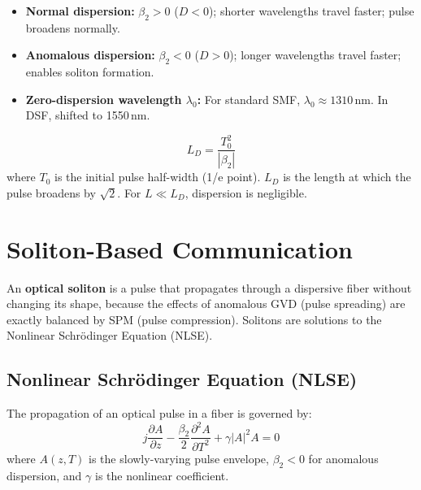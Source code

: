 \documentclass[12pt,a4paper]{article}
\begin{document}
\begin{itemize}[leftmargin=*, itemsep=3pt]
  \item \textbf{Normal dispersion:} $\beta_2 > 0$ ($D < 0$); shorter wavelengths travel faster; pulse broadens normally.
  \item \textbf{Anomalous dispersion:} $\beta_2 < 0$ ($D > 0$); longer wavelengths travel faster; enables soliton formation.
  \item \textbf{Zero-dispersion wavelength $\lambda_0$:} For standard SMF, $\lambda_0 \approx 1310$\,nm. In DSF, shifted to 1550\,nm.
\end{itemize}

\begin{tcolorbox}[formulabox, title={\textbf{Dispersion Length}}]
\[
L_D = \frac{T_0^2}{|\beta_2|}
\]
where $T_0$ is the initial pulse half-width (1/e point). $L_D$ is the length at which the pulse broadens by $\sqrt{2}$. For $L \ll L_D$, dispersion is negligible.
\end{tcolorbox}

\section{Soliton-Based Communication}

\begin{tcolorbox}[defbox, title={\textbf{Optical Soliton}}]
An \textbf{optical soliton} is a pulse that propagates through a dispersive fiber without changing its shape, because the effects of anomalous GVD (pulse spreading) are exactly balanced by SPM (pulse compression). Solitons are solutions to the Nonlinear Schr\"{o}dinger Equation (NLSE).
\end{tcolorbox}

\subsection{Nonlinear Schr\"{o}dinger Equation (NLSE)}
The propagation of an optical pulse in a fiber is governed by:
\[
j\frac{\partial A}{\partial z} - \frac{\beta_2}{2}\frac{\partial^2 A}{\partial T^2} + \gamma |A|^2 A = 0
\]
where $A(z,T)$ is the slowly-varying pulse envelope, $\beta_2 < 0$ for anomalous dispersion, and $\gamma$ is the nonlinear coefficient.
\end{document}
